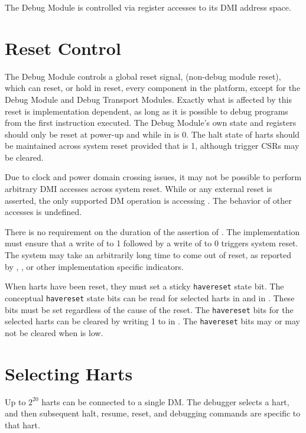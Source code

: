 The Debug Module is controlled via register accesses to its DMI address space.

\section{Reset Control} \label{reset}

The Debug Module controls a global reset signal, \Fndmreset
(non-debug module reset),
which can reset, or hold in reset, every component in the platform,
except for the Debug Module and Debug Transport Modules.
Exactly what is affected by this reset is implementation dependent, as long as
it is possible to debug programs from the first instruction executed.
The Debug Module's own state and registers should only be
reset at power-up and while
\Fdmactive in \Rdmcontrol is 0.
The halt state of harts should be
maintained across system reset provided that \Fdmactive is 1,
although trigger CSRs may be cleared.

Due to clock and power domain crossing issues,
it may not be possible to perform arbitrary DMI accesses across
system reset.
While \Fndmreset or any external reset is asserted, the only supported DM
operation is accessing \Rdmcontrol. The behavior of other accesses is
undefined.

There is no requirement on the duration of the assertion of \Fndmreset.
The implementation must ensure that a write of \Fndmreset to 1 followed by
a write of \Fndmreset to 0 triggers system reset. The system may take
an arbitrarily long time to come out of reset, as reported by \Fallunavail,
\Fanyunavail, or other implementation specific indicators.

When harts have been reset, they must set a sticky {\tt havereset} state bit.
The conceptual {\tt havereset} state bits can be read for selected harts in
\Fanyhavereset and \Fallhavereset in \Rdmstatus.
These bits must be set regardless of the cause of the reset.
The {\tt havereset} bits for the selected harts
can be cleared by writing 1 to \Fackhavereset in \Rdmcontrol.
The {\tt havereset} bits may or may not be cleared 
when \Fdmactive is low.

\section{Selecting Harts} \label{selectingharts}

Up to $2^{20}$ harts can be connected to a single DM. The debugger
selects a hart, and then subsequent halt, resume, reset, and debugging
commands are specific to that hart.

